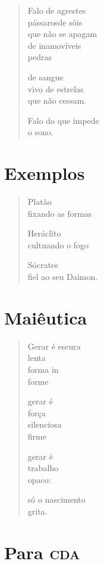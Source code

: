 \begin{verse}
Falo de agrestes\\
pássaros\qquad\qquad de sóis\\
\qquad que não se apagam\\
\qquad de inamovíveis\\
\qquad pedras

\qquad de sangue\\
\qquad vivo de estrelas\\
\qquad que não cessam.

\qquad Falo do que impede\\
\qquad o sono.
\end{verse}

\chapter{Exemplos}

\begin{verse}
Platão\\
fixando as formas

Heráclito\\
cultuando o fogo

Sócrates\\
fiel ao seu Daimon.
\end{verse}

\chapter{Maiêutica}

\begin{verse}
Gerar é escura\\
lenta\\
forma in\\
\qquad\qquad forme

gerar é\\
força\\
silenciosa\\
firme

gerar é\\
trabalho\\
opaco:

só o nascimento\\
grita.
\end{verse}

\chapter{Para \textsc{cda}}


